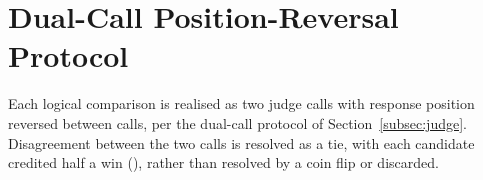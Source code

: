 \section{Dual-Call Position-Reversal Protocol}

Each logical comparison is realised as two judge calls with response
position reversed between calls, per the dual-call protocol of
Section~\ref{subsec:judge}. Disagreement between the two calls is
resolved as a tie, with each candidate credited half a win
(\parencite{davidson1970ties}), rather than resolved by a coin flip or
discarded.
